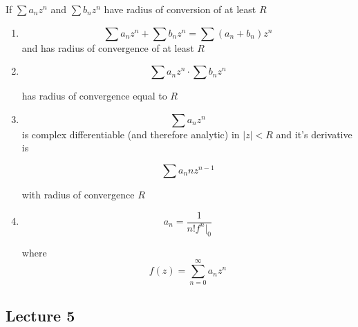 \documentclass[../notes.tex]{subfiles}
\begin{document}
\begin{theorem}
	If $ \sum a_n z^n $  and $ \sum b_n z^n $  have radius of conversion of at least $ R $ 

	\begin{enumerate}
		\item 

	\begin{equation}
		 \sum a_n z^n  +  \sum b_n z^n  =  \sum (a_n + b_n) z^n 
	\end{equation}
	and has radius of convergence of at least $ R $

\item 

	\begin{equation}
		 \sum a_n z^n  \cdot \sum b_n z^n
	\end{equation}

	has radius of convergence equal to $ R $ 

\item 

	\begin{equation}
		\sum a_n z^n
	\end{equation}
	is complex differentiable (and therefore analytic) in $ |z| < R $ and it's derivative is

	\begin{equation}
		\sum a_n n z^{n-1}
	\end{equation}

	with radius of convergence $ R $
\item 
	\begin{equation}
		a_n = \frac{1}{n! f^n|_0}
	\end{equation}

where 
\begin{equation}
	f(z) = \sum^{\infty}_{n=0} a_n z^n
\end{equation}

	\end{enumerate}
	
	
\end{theorem}




\subsection{Lecture 5}
\end{document}
